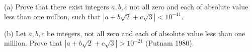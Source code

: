 (a) Prove that there exist integers $a, b, c$ not all zero and each of absolute value less than one million, such that $|a + b\sqrt{2} + c\sqrt{3}| < 10^{-11}$.

(b) Let $a, b, c$ be integers, not all zero and each of absolute value less than one million. Prove that $|a + b\sqrt{2} + c\sqrt{3}| > 10^{-21}$ (Putnam 1980).
